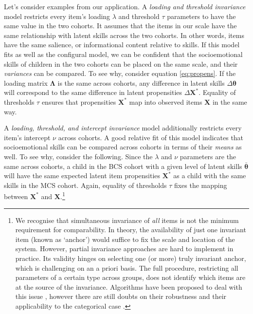 Let's consider examples from our application. A \emph{loading and threshold invariance} model restricts every item's loading $\lambda$ and threshold $\tau$ parameters to have the same value in the two cohorts. It assumes that the items in our scale have the same relationship with latent skills across the two cohorts. In other words, items have the same salience, or informational content relative to skills. If this model fits as well as the configural model, we can be confident that the socioemotional skills of children in the two cohorts can be placed on the same scale, and their \emph{variances} can be compared. To see why, consider equation \eqref{eq:propens}. If the loading matrix $\bm{\Lambda}$ is the same across cohorts, any difference in latent skills $\Delta\bm{\theta}$ will correspond to the same difference in latent propensities $\Delta\bm{X}^*$. Equality of thresholds $\tau$ ensures that propensities $\bm{X}^*$ map into observed items $\bm{X}$ in the same way.

A \emph{loading, threshold, and intercept invariance} model additionally restricts every item's intercept $\nu$ across cohorts. A good relative fit of this model indicates that socioemotional skills can be compared across cohorts in terms of their \emph{means} as well. To see why, consider the following. Since the $\lambda$ and $\nu$ parameters are the same across cohorts, a child in the BCS cohort with a given level of latent skills $\bar{\bm{\theta}}$ will have the same expected latent item propensities $\bm{X}^*$ as a child with the same skills in the MCS cohort. Again, equality of thresholds $\tau$ fixes the mapping between $\bm{X}^*$ and $\bm{X}$.\footnote{We recognise that simultaneous invariance of \emph{all} items is not the minimum requirement for comparability. In theory, the availability of just one invariant item (known as `anchor') would suffice to fix the scale and location of the system. However, partial invariance approaches are hard to implement in practice. Its validity hinges on selecting one (or more) truly invariant anchor, which is challenging on an a priori basis. The full procedure, restricting all parameters of a certain type across groups, does not identify which items are at the source of the invariance. Algorithms have been proposed to deal with this issue \citep{Yoon2007,Cheung2012}, however there are still doubts on their robustness and their applicability to the categorical case \citep{Vandenberg2016}.}

